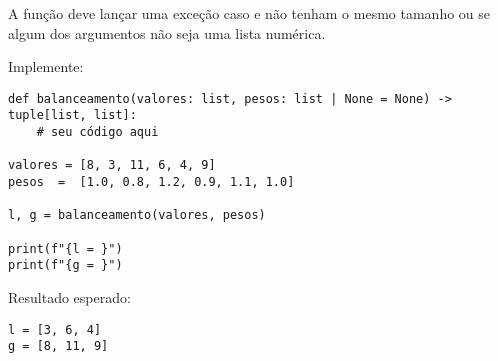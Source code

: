 A função deve lançar uma exceção caso  e  não tenham o mesmo tamanho ou se algum dos
argumentos não seja uma lista numérica.

Implemente:
\begin{verbatim}
def balanceamento(valores: list, pesos: list | None = None) -> tuple[list, list]:
    # seu código aqui

valores = [8, 3, 11, 6, 4, 9]
pesos  =  [1.0, 0.8, 1.2, 0.9, 1.1, 1.0]

l, g = balanceamento(valores, pesos)

print(f"{l = }")
print(f"{g = }")
\end{verbatim}

Resultado esperado:
\begin{verbatim}
l = [3, 6, 4]
g = [8, 11, 9]
\end{verbatim}










